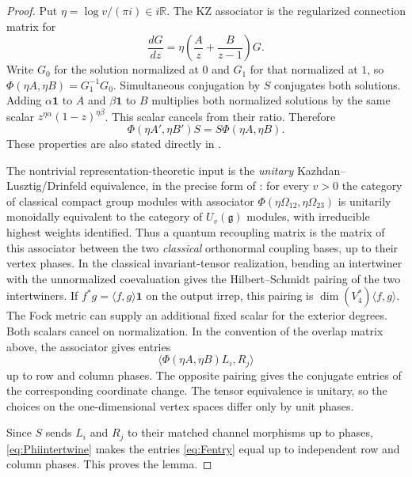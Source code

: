 \documentclass[10pt,a4paper]{article}
\newcommand{\id}{\mathbf 1}
\begin{document}
\begin{proof}
Put $\eta=\log v/(\pi i)\in i\mathbb R$. The KZ associator is the
regularized connection matrix for
\begin{equation}\label{eq:KZ}
 \frac{dG}{dz}=\eta\left(\frac A z+\frac B{z-1}\right)G.
\end{equation}
Write $G_0$ for the solution normalized at $0$ and $G_1$ for that normalized
at $1$, so $\Phi(\eta A,\eta B)=G_1^{-1}G_0$. Simultaneous conjugation by
$S$ conjugates both solutions. Adding $\alpha\id$ to $A$ and
$\beta\id$ to $B$ multiplies both normalized solutions by the same scalar
$z^{\eta\alpha}(1-z)^{\eta\beta}$. This scalar cancels from their ratio.
Therefore
\begin{equation}\label{eq:Phiintertwine}
 \Phi(\eta A',\eta B')S=S\Phi(\eta A,\eta B).
\end{equation}
These properties are also stated directly in \cite[Sec.~2, p.~14]{NT}.

The nontrivial representation-theoretic input is the \emph{unitary}
Kazhdan--Lusztig/Drinfeld equivalence, in the precise form of
\cite[Theorem~3.1]{NT}: for every $v>0$ the category of classical compact
group modules with associator $\Phi(\eta\Omega_{12},\eta\Omega_{23})$
is unitarily monoidally equivalent to the category of $U_v(\mathfrak g)$
modules, with irreducible highest weights identified. Thus a quantum
recoupling matrix is the matrix of this associator between the two
\emph{classical} orthonormal coupling bases, up to their vertex phases.
In the classical invariant-tensor realization, bending an intertwiner
with the unnormalized coevaluation gives the Hilbert--Schmidt pairing
of the two intertwiners. If $f^*g=\langle f,g\rangle\id$ on the output
irrep, this pairing is $\dim(V_4^*)\langle f,g\rangle$. The Fock metric
can supply an additional fixed scalar for the exterior degrees. Both
scalars cancel on normalization. In the convention of the overlap matrix
above, the associator gives entries
\begin{equation}\label{eq:Fentry}
 \langle \Phi(\eta A,\eta B)L_i,R_j\rangle
\end{equation}
up to row and column phases. The opposite pairing gives the conjugate
entries of the corresponding coordinate change. The tensor equivalence
is unitary, so the choices on the one-dimensional vertex spaces differ
only by unit phases.

Since $S$ sends $L_i$ and $R_j$ to their matched channel morphisms up to
phases, \eqref{eq:Phiintertwine} makes the entries \eqref{eq:Fentry} equal
up to independent row and column phases. This proves the lemma.
\end{proof}
\end{document}
